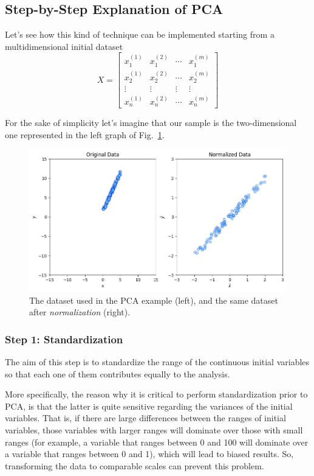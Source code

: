 \subsection{Step-by-Step Explanation of PCA}

Let's see how this kind of technique can be implemented starting from a multidimensional initial dataset 
\begin{equation}
	X=\begin{bmatrix}
		x^{(1)}_1 &x^{(2)}_1&\cdots &x^{(m)}_1 \\
		x^{(1)}_2 &x^{(2)}_2&\cdots &x^{(m)}_2 \\
		\vdots &\vdots &\vdots &\vdots \\
		x^{(1)}_n &x^{(2)}_n&\cdots &x^{(m)}_n 
	\end{bmatrix}
\end{equation}

For the sake of simplicity let's imagine that our sample is the two-dimensional one represented in the left graph of Fig.~\ref{fig:pca_dataset}.

\begin{figure}[htb]
	\centering
	\includegraphics[width=0.9\linewidth]{figures/pca_raw_std_data.png}
	\caption{The dataset used in the PCA example (left), and the same dataset after \emph{normalization} (right).}
	\label{fig:pca_dataset}
\end{figure}

\subsubsection*{Step 1: Standardization}

The aim of this step is to standardize the range of the continuous initial variables so that each one of them contributes equally to the analysis.

More specifically, the reason why it is critical to perform standardization prior to PCA, is that the latter is quite sensitive regarding the variances of the initial variables. That is, if there are large differences between the ranges of initial variables, those variables with larger ranges will dominate over those with small ranges (for example, a variable that ranges between 0 and 100 will dominate over a variable that ranges between 0 and 1), which will lead to biased results. So, transforming the data to comparable scales can prevent this problem.

